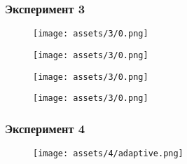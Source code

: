 \subsubsection{Эксперимент 3}
\begin{figure}[h!]
    \centering
    \texttt{[image: assets/3/0.png]}
    \label{exp3:10}
\end{figure}
\begin{figure}[h!]
    \centering
    \texttt{[image: assets/3/0.png]}
    \label{exp3:2_5}
\end{figure}
\begin{figure}[h!]
    \centering
    \texttt{[image: assets/3/0.png]}
    \label{exp3:1}
\end{figure}
\begin{figure}[h!]
    \centering
    \texttt{[image: assets/3/0.png]}
    \label{exp3:_0.25}
\end{figure}
\pagebreak
\subsubsection{Эксперимент 4}
\begin{figure}[h!]
    \centering
    \texttt{[image: assets/4/adaptive.png]}
    \label{exp4:algo}
\end{figure}
